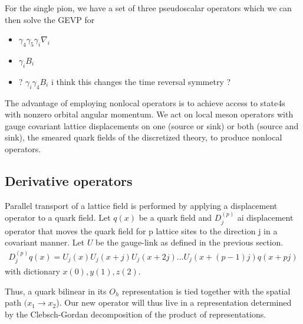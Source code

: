 For the single pion, we have a set of three pseudoscalar operators which we can then solve the GEVP for
\begin{itemize} 
    \item $\gamma_4\gamma_5\gamma_i \nabla_i$
    \item $\gamma_iB_i$ 
    \item ? $\gamma_i\gamma_4B_i$ i think this changes the time reversal symmetry ? 
    
\end{itemize}
The advantage of employing nonlocal operators is to achieve access to state4s with nonzero orbital angular momentum. We act on local meson operators with gauge covariant lattice displacements on one (source or sink) or both (source and sink), the smeared quark fields of the discretized theory, to produce nonlocal operators. 

\subsection{Derivative operators}
Parallel transport of a lattice field is performed by applying a displacement operator to a quark field.  Let $q(x)$ be a quark field and $D_j^{(p)}$ ai displacement operator that moves the quark field for p lattice sites to the direction j in a covariant manner. Let $U$ be the gauge-link as defined in the previous section.
\begin{align}
    D_j^{(p)} q(x) = U_j(x) U_j(x+j) U_j(x+2j)...U_j(x+(p-1)j) q(x+pj)
\end{align}
with dictionary $x(0), y(1), z(2)$.

Thus, a quark bilinear in its $O_h$ representation is tied together with the spatial path $(x_1 \to x_2$). Our new operator will thus live in a representation determined by the Clebsch-Gordan decomposition of the product of representations. 

